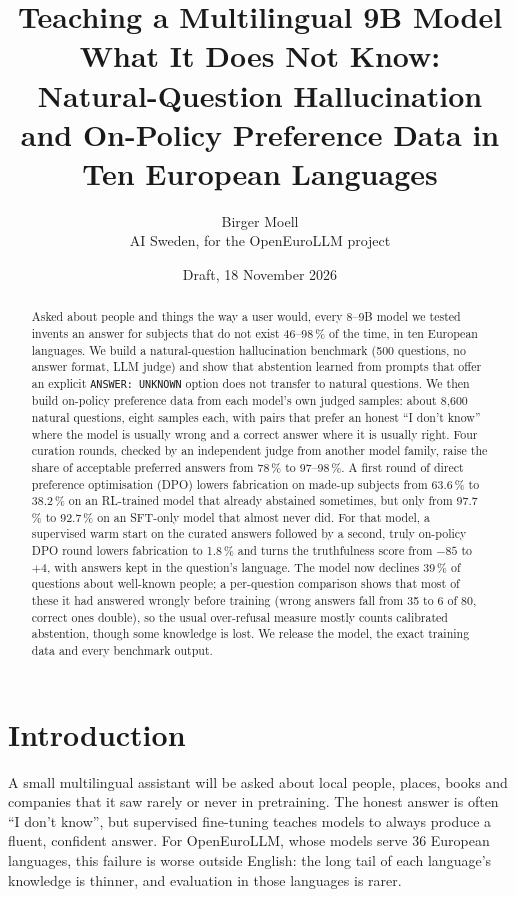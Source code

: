 \documentclass[11pt,a4paper]{article}
\title{Teaching a Multilingual 9B Model What It Does Not Know:\\
Natural-Question Hallucination and On-Policy Preference Data in Ten European Languages}
\author{Birger Moell\\AI Sweden, for the OpenEuroLLM project}
\date{Draft, 18 November 2026}
\begin{document}
\maketitle

\begin{abstract}
Asked about people and things the way a user would, every 8--9B model we tested invents an answer for subjects that do not exist 46--98\,\% of the time, in ten European languages.
We build a natural-question hallucination benchmark (500 questions, no answer format, LLM judge) and show that abstention learned from prompts that offer an explicit \texttt{ANSWER: UNKNOWN} option does not transfer to natural questions.
We then build on-policy preference data from each model's own judged samples: about 8,600 natural questions, eight samples each, with pairs that prefer an honest ``I don't know'' where the model is usually wrong and a correct answer where it is usually right.
Four curation rounds, checked by an independent judge from another model family, raise the share of acceptable preferred answers from 78\,\% to 97--98\,\%.
A first round of direct preference optimisation (DPO) lowers fabrication on made-up subjects from 63.6\,\% to 38.2\,\% on an RL-trained model that already abstained sometimes, but only from 97.7\,\% to 92.7\,\% on an SFT-only model that almost never did.
For that model, a supervised warm start on the curated answers followed by a second, truly on-policy DPO round lowers fabrication to 1.8\,\% and turns the truthfulness score from $-85$ to $+4$, with answers kept in the question's language.
The model now declines 39\,\% of questions about well-known people; a per-question comparison shows that most of these it had answered wrongly before training (wrong answers fall from 35 to 6 of 80, correct ones double), so the usual over-refusal measure mostly counts calibrated abstention, though some knowledge is lost.
We release the model, the exact training data and every benchmark output.
\end{abstract}

\section{Introduction}

A small multilingual assistant will be asked about local people, places, books and companies that it saw rarely or never in pretraining.
The honest answer is often ``I don't know'', but supervised fine-tuning teaches models to always produce a fluent, confident answer.
For OpenEuroLLM, whose models serve 36 European languages, this failure is worse outside English: the long tail of each language's knowledge is thinner, and evaluation in those languages is rarer.
\end{document}

